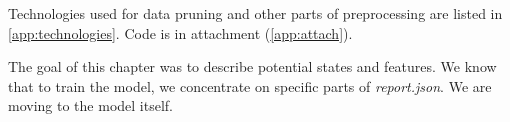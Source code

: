 Technologies used for data pruning and other parts of preprocessing are listed in \ref{app:technologies}. Code is in attachment (\ref{app:attach}).

The goal of this chapter was to describe potential states and features. We know that to train the model, we concentrate on specific parts of \emph{report.json}. We are moving to the model itself.











